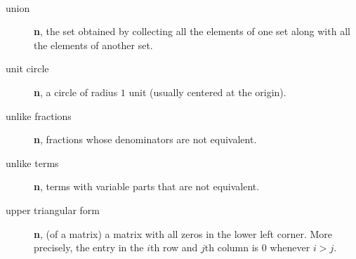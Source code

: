 \documentclass[10pt,]{book}
\newcommand{\terminology}[1]{\textbf{#1}}
\theoremstyle{plain}
\theoremstyle{definition}
\theoremstyle{definition}
\theoremstyle{definition}
\numberwithin{equation}{part}
\newcommand{\gt}{>}
\begin{document}
\paragraph[{}]{}\hypertarget{paragraphs-24}{}
\leavevmode%
\begin{description}
\item[{union}]\hypertarget{li-832}{}\terminology{n}, the set obtained by collecting all the elements of one set along with all the elements of another set.%
\item[{unit circle}]\hypertarget{li-833}{}\terminology{n}, a circle of radius \(1\) unit (usually centered at the origin).%
\item[{unlike fractions}]\hypertarget{li-834}{}\terminology{n}, fractions whose denominators are not equivalent.%
\item[{unlike terms}]\hypertarget{li-835}{}\terminology{n}, terms with variable parts that are not equivalent.%
\item[{upper triangular form}]\hypertarget{li-836}{}\terminology{n}, (of a matrix) a matrix with all zeros in the lower left corner. More precisely, the entry in the \(i\)th row and \(j\)th column is \(0\) whenever \(i \gt j\).%
\end{description}
%
\typeout{************************************************}
\typeout{************************************************}
\end{document}
